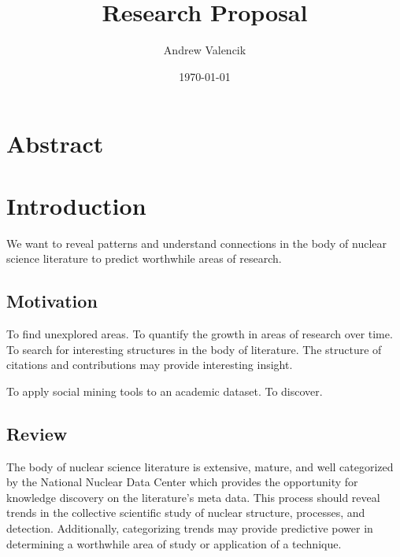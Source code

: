 \documentclass[12pt]{article}
\begin{document}
\title{Research Proposal}
\author{Andrew Valencik}
\date{\today}
\maketitle
\tableofcontents
\begin{doublespacing}


\pagebreak
\section{Abstract}

\pagebreak
\section{Introduction}
We want to reveal patterns and understand connections in the body of nuclear science literature to predict worthwhile areas of research.

\subsection{Motivation}
To find unexplored areas.
To quantify the growth in areas of research over time.
To search for interesting structures in the body of literature. The structure of citations and contributions may provide interesting insight.

To apply social mining tools to an academic dataset.
To discover.


\subsection{Review}
The body of nuclear science literature is extensive, mature, and well categorized by the National Nuclear Data Center \citep{Kurgan200603} which provides the opportunity for knowledge discovery on the literature's meta data.
This process should reveal trends in the collective scientific study of nuclear structure, processes, and detection.
Additionally, categorizing trends may provide predictive power in determining a worthwhile area of study or application of a technique.



\end{doublespacing}
\end{document}
